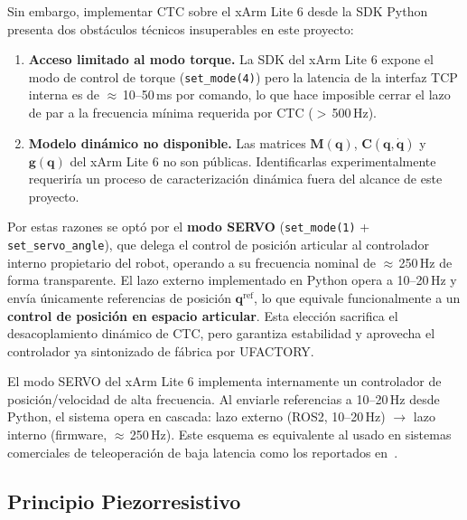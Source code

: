 \documentclass[journal,10pt,twoside]{IEEEtran}
\newcommand{\xarm}{xArm Lite 6}
\begin{document}
Sin embargo, implementar CTC sobre el \xarm{} desde la SDK Python
presenta dos obstáculos técnicos insuperables en este proyecto:

\begin{enumerate}[leftmargin=1.4em,itemsep=2pt]
  \item \textbf{Acceso limitado al modo torque.}
        La SDK del \xarm{} expone el modo de control de torque
        (\texttt{set\_mode(4)}) pero la latencia de la interfaz TCP
        interna es de $\approx$\,10--50\,ms por comando, lo que
        hace imposible cerrar el lazo de par a la frecuencia mínima
        requerida por CTC ($>$\,500\,Hz).
  \item \textbf{Modelo dinámico no disponible.}
        Las matrices $\bm{M}(\bm{q})$, $\bm{C}(\bm{q},\dot{\bm{q}})$
        y $\bm{g}(\bm{q})$ del \xarm{} no son públicas.
        Identificarlas experimentalmente requeriría un proceso de
        caracterización dinámica fuera del alcance de este proyecto.
\end{enumerate}

Por estas razones se optó por el \textbf{modo SERVO}
(\texttt{set\_mode(1)} + \texttt{set\_servo\_angle}), que delega el
control de posición articular al controlador interno propietario del
robot, operando a su frecuencia nominal de $\approx$\,250\,Hz de forma
transparente. El lazo externo implementado en Python opera a 10--20\,Hz
y envía únicamente referencias de posición $\bm{q}^{\text{ref}}$,
lo que equivale funcionalmente a un \textbf{control de posición en
espacio articular}. Esta elección sacrifica el desacoplamiento dinámico
de CTC, pero garantiza estabilidad y aprovecha el controlador
ya sintonizado de fábrica por UFACTORY.

\begin{infobox}
  \small
  El modo SERVO del \xarm{} implementa internamente un controlador
  de posición/velocidad de alta frecuencia. Al enviarle referencias
  a 10--20\,Hz desde Python, el sistema opera en cascada:
  lazo externo (ROS2, 10--20\,Hz) $\to$ lazo interno (firmware,
  $\approx$\,250\,Hz). Este esquema es equivalente al usado en
  sistemas comerciales de teleoperación de baja latencia como
  los reportados en~\cite{niemeyer2008}.
\end{infobox}

\subsection{Principio Piezorresistivo}
\end{document}

